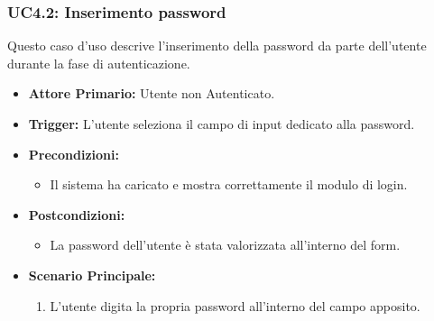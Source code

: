 \documentclass[12pt, a4paper]{article}
\begin{document}
\subsubsection{UC4.2: Inserimento password}\label{uc:4.2}
Questo caso d'uso descrive l'inserimento della password da parte dell'utente durante la fase di autenticazione.
\begin{itemize}
    \item \textbf{Attore Primario:} Utente non Autenticato.
    \item \textbf{Trigger:} L'utente seleziona il campo di input dedicato alla password.
    \item \textbf{Precondizioni:}\begin{itemize}\item Il sistema ha caricato e mostra correttamente il modulo di login.\end{itemize}
    \item \textbf{Postcondizioni:}\begin{itemize}\item La password dell'utente è stata valorizzata all'interno del form.\end{itemize}
    \item \textbf{Scenario Principale:}
    \begin{enumerate}
        \item L'utente digita la propria password all'interno del campo apposito.
    \end{enumerate}
\end{itemize}
\end{document}

